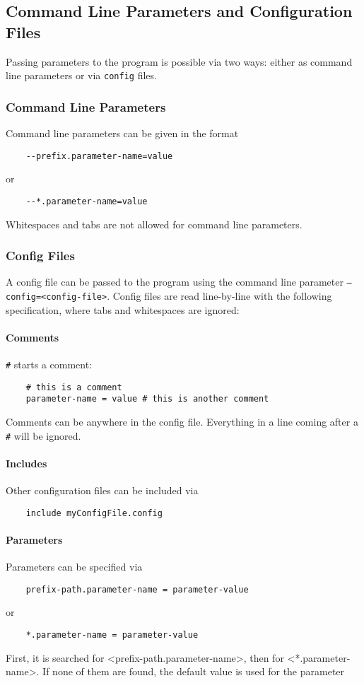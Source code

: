 \subsection{Command Line Parameters and Configuration Files}

Passing parameters to the program is possible via two ways: either as command line parameters or via \texttt{config} files.

\subsubsection*{Command Line Parameters}

Command line parameters can be given in the format
\begin{verbatim}
    --prefix.parameter-name=value
\end{verbatim}
or
\begin{verbatim}
    --*.parameter-name=value
\end{verbatim}
Whitespaces and tabs are not allowed for command line parameters.

\subsubsection*{Config Files}

A config file can be passed to the program using the command line parameter \texttt{--config=<config-file>}.
Config files are read line-by-line with the following specification, where tabs and whitespaces are ignored:

\paragraph{Comments}
\texttt{\#} starts a comment:
\begin{verbatim}
    # this is a comment
    parameter-name = value # this is another comment
\end{verbatim}
Comments can be anywhere in the config file. Everything in a line coming after a \texttt{\#} will be ignored.

\paragraph{Includes}
Other configuration files can be included via
\begin{verbatim}
    include myConfigFile.config
\end{verbatim}

\paragraph{Parameters}
Parameters can be specified via
\begin{verbatim}
    prefix-path.parameter-name = parameter-value
\end{verbatim}
or
\begin{verbatim}
    *.parameter-name = parameter-value
\end{verbatim}
First, it is searched for <prefix-path.parameter-name>, then for <*.parameter-name>. If none of them are found, the default value is used for the parameter

